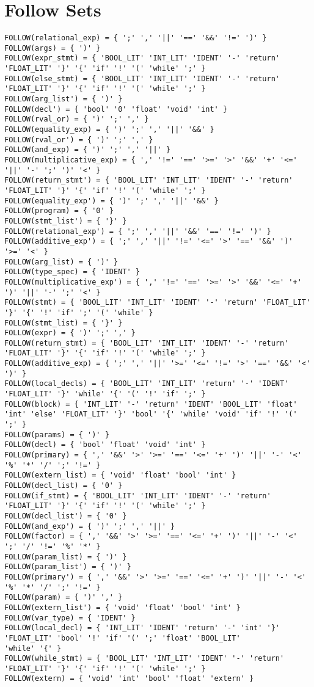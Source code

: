 \documentclass[10pt,a4paper]{article}
\begin{document}
\section*{Follow Sets}
{
\small
\begin{verbatim}
FOLLOW(relational_exp) = { ';' ',' '||' '==' '&&' '!=' ')' }
FOLLOW(args) = { ')' }
FOLLOW(expr_stmt) = { 'BOOL_LIT' 'INT_LIT' 'IDENT' '-' 'return' 'FLOAT_LIT' '}' '{' 'if' '!' '(' 'while' ';' }
FOLLOW(else_stmt) = { 'BOOL_LIT' 'INT_LIT' 'IDENT' '-' 'return' 'FLOAT_LIT' '}' '{' 'if' '!' '(' 'while' ';' }
FOLLOW(arg_list') = { ')' }
FOLLOW(decl') = { 'bool' '0' 'float' 'void' 'int' }
FOLLOW(rval_or) = { ')' ';' ',' }
FOLLOW(equality_exp) = { ')' ';' ',' '||' '&&' }
FOLLOW(rval_or') = { ')' ';' ',' }
FOLLOW(and_exp) = { ')' ';' ',' '||' }
FOLLOW(multiplicative_exp) = { ',' '!=' '==' '>=' '>' '&&' '+' '<=' '||' '-' ';' ')' '<' }
FOLLOW(return_stmt') = { 'BOOL_LIT' 'INT_LIT' 'IDENT' '-' 'return' 'FLOAT_LIT' '}' '{' 'if' '!' '(' 'while' ';' }
FOLLOW(equality_exp') = { ')' ';' ',' '||' '&&' }
FOLLOW(program) = { '0' }
FOLLOW(stmt_list') = { '}' }
FOLLOW(relational_exp') = { ';' ',' '||' '&&' '==' '!=' ')' }
FOLLOW(additive_exp') = { ';' ',' '||' '!=' '<=' '>' '==' '&&' ')' '>=' '<' }
FOLLOW(arg_list) = { ')' }
FOLLOW(type_spec) = { 'IDENT' }
FOLLOW(multiplicative_exp') = { ',' '!=' '==' '>=' '>' '&&' '<=' '+' ')' '||' '-' ';' '<' }
FOLLOW(stmt) = { 'BOOL_LIT' 'INT_LIT' 'IDENT' '-' 'return' 'FLOAT_LIT' '}' '{' '!' 'if' ';' '(' 'while' }
FOLLOW(stmt_list) = { '}' }
FOLLOW(expr) = { ')' ';' ',' }
FOLLOW(return_stmt) = { 'BOOL_LIT' 'INT_LIT' 'IDENT' '-' 'return' 'FLOAT_LIT' '}' '{' 'if' '!' '(' 'while' ';' }
FOLLOW(additive_exp) = { ';' ',' '||' '>=' '<=' '!=' '>' '==' '&&' '<' ')' }
FOLLOW(local_decls) = { 'BOOL_LIT' 'INT_LIT' 'return' '-' 'IDENT' 'FLOAT_LIT' '}' 'while' '{' '(' '!' 'if' ';' }
FOLLOW(block) = { 'INT_LIT' '-' 'return' 'IDENT' 'BOOL_LIT' 'float' 'int' 'else' 'FLOAT_LIT' '}' 'bool' '{' 'while' 'void' 'if' '!' '(' ';' }
FOLLOW(params) = { ')' }
FOLLOW(decl) = { 'bool' 'float' 'void' 'int' }
FOLLOW(primary) = { ',' '&&' '>' '>=' '==' '<=' '+' ')' '||' '-' '<' '%' '*' '/' ';' '!=' }
FOLLOW(extern_list) = { 'void' 'float' 'bool' 'int' }
FOLLOW(decl_list) = { '0' }
FOLLOW(if_stmt) = { 'BOOL_LIT' 'INT_LIT' 'IDENT' '-' 'return' 'FLOAT_LIT' '}' '{' 'if' '!' '(' 'while' ';' }
FOLLOW(decl_list') = { '0' }
FOLLOW(and_exp') = { ')' ';' ',' '||' }
FOLLOW(factor) = { ',' '&&' '>' '>=' '==' '<=' '+' ')' '||' '-' '<' ';' '/' '!=' '%' '*' }
FOLLOW(param_list) = { ')' }
FOLLOW(param_list') = { ')' }
FOLLOW(primary') = { ',' '&&' '>' '>=' '==' '<=' '+' ')' '||' '-' '<' '%' '*' '/' ';' '!=' }
FOLLOW(param) = { ')' ',' }
FOLLOW(extern_list') = { 'void' 'float' 'bool' 'int' }
FOLLOW(var_type) = { 'IDENT' }
FOLLOW(local_decl) = { 'INT_LIT' 'IDENT' 'return' '-' 'int' '}' 'FLOAT_LIT' 'bool' '!' 'if' '(' ';' 'float' 'BOOL_LIT' 
'while' '{' }
FOLLOW(while_stmt) = { 'BOOL_LIT' 'INT_LIT' 'IDENT' '-' 'return' 'FLOAT_LIT' '}' '{' 'if' '!' '(' 'while' ';' }
FOLLOW(extern) = { 'void' 'int' 'bool' 'float' 'extern' }    
\end{verbatim}
}
\end{document}
